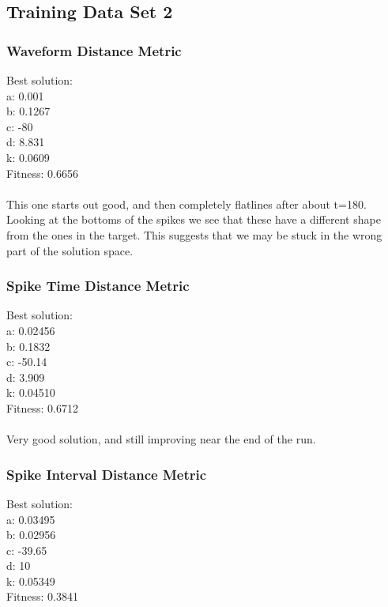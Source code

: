 \documentclass[a4paper,12pt]{article}
\begin{document}
\subsection{Training Data Set 2}
\subsubsection{Waveform Distance Metric}
Best solution: \\
a: 0.001 \\
b: 0.1267 \\
c: -80 \\
d: 8.831 \\
k: 0.0609 \\
Fitness: 0.6656
\paragraph{}This one starts out good, and then completely flatlines after about t=180. Looking at the bottoms of the spikes we see that these have a different shape from the ones in the target. This suggests that we may be stuck in the wrong part of the solution space.

\subsubsection{Spike Time Distance Metric}
Best solution: \\
a: 0.02456 \\
b: 0.1832 \\
c: -50.14 \\
d: 3.909 \\
k: 0.04510 \\
Fitness: 0.6712
\paragraph{}Very good solution, and still improving near the end of the run.

\subsubsection{Spike Interval Distance Metric}
Best solution: \\
a: 0.03495 \\
b: 0.02956 \\
c: -39.65 \\
d: 10 \\
k: 0.05349 \\
Fitness: 0.3841
\end{document}
